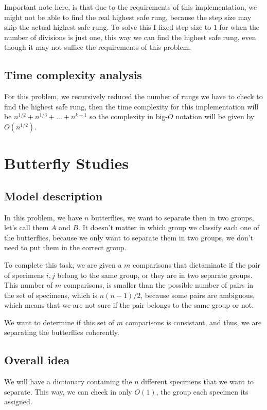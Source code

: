\documentclass{article}
\begin{document}
Important note here, is that due to the requirements of this implementation, we might not be able to find the real highest safe rung, because the step size may skip the actual highest safe rung. To solve this I fixed step size to $1$ for when the number of divisions is just one, this way we can find the highest safe rung, even though it may not suffice the requirements of this problem.

\subsection*{Time complexity analysis}

For this problem, we recursively reduced the number of rungs we have to check to find the highest safe rung, then the time complexity for this implementation will be $n^{1/2}+n^{1/3}+...+n^{k+1}$ so the complexity in big-$O$ notation will be given by $O(n^{1/2})$.

\section*{Butterfly Studies}

\subsection*{Model description}

In this problem, we have $n$ butterflies, we want to separate then in two groups, let's call them $A$ and $B$. It doesn't matter in which group we classify each one of the butterflies, because we only want to separate them in two groups, we don't need to put them in the correct group.

To complete this task, we are given a $m$ comparisons that dictaminate if the pair of specimens $i,j$ belong to the same group, or they are in two separate groups. This number of $m$ comparisons, is smaller than the possible number of pairs in the set of specimens, which is $n(n-1)/2$, because some pairs are ambiguous, which means that we are not sure if the pair belongs to the same group or not.

We want to determine if this set of $m$ comparisons is consistant, and thus, we are separating the butterflies coherently.

\subsection*{Overall idea}

We will have a dictionary containing the $n$ different specimens that we want to separate. This way, we can check in only $O(1)$, the group each specimen its assigned.
\end{document}
